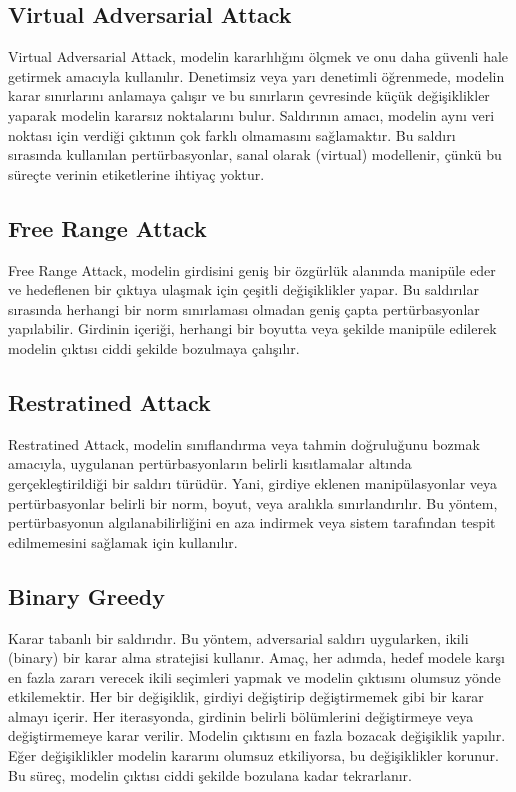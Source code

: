 \newpage

\subsection{Virtual Adversarial Attack}

Virtual Adversarial Attack, modelin kararlılığını ölçmek ve onu daha güvenli hale getirmek amacıyla kullanılır. Denetimsiz veya yarı denetimli öğrenmede, modelin karar sınırlarını anlamaya çalışır ve bu sınırların çevresinde küçük değişiklikler yaparak modelin kararsız noktalarını bulur. Saldırının amacı, modelin aynı veri noktası için verdiği çıktının çok farklı olmamasını sağlamaktır. Bu saldırı sırasında kullanılan pertürbasyonlar, sanal olarak (virtual) modellenir, çünkü bu süreçte verinin etiketlerine ihtiyaç yoktur.

\newpage

\subsection{Free Range Attack}

Free Range Attack, modelin girdisini geniş bir özgürlük alanında manipüle eder ve hedeflenen bir çıktıya ulaşmak için çeşitli değişiklikler yapar. Bu saldırılar sırasında herhangi bir norm sınırlaması olmadan geniş çapta pertürbasyonlar yapılabilir. Girdinin içeriği, herhangi bir boyutta veya şekilde manipüle edilerek modelin çıktısı ciddi şekilde bozulmaya çalışılır.

\newpage

\subsection{Restratined Attack}

Restratined Attack, modelin sınıflandırma veya tahmin doğruluğunu bozmak amacıyla, uygulanan pertürbasyonların belirli kısıtlamalar altında gerçekleştirildiği bir saldırı türüdür. Yani, girdiye eklenen manipülasyonlar veya pertürbasyonlar belirli bir norm, boyut, veya aralıkla sınırlandırılır. Bu yöntem, pertürbasyonun algılanabilirliğini en aza indirmek veya sistem tarafından tespit edilmemesini sağlamak için kullanılır.

\newpage

\subsection{Binary Greedy}

Karar tabanlı bir saldırıdır. Bu yöntem, adversarial saldırı uygularken, ikili (binary) bir karar alma stratejisi kullanır. Amaç, her adımda, hedef modele karşı en fazla zararı verecek ikili seçimleri yapmak ve modelin çıktısını olumsuz yönde etkilemektir. Her bir değişiklik, girdiyi değiştirip değiştirmemek gibi bir karar almayı içerir. Her iterasyonda, girdinin belirli bölümlerini değiştirmeye veya değiştirmemeye karar verilir. Modelin çıktısını en fazla bozacak değişiklik yapılır. Eğer değişiklikler modelin kararını olumsuz etkiliyorsa, bu değişiklikler korunur. Bu süreç, modelin çıktısı ciddi şekilde bozulana kadar tekrarlanır.

